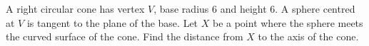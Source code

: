 A right circular cone has vertex $V$, base radius $6$ and height $6$. A sphere centred at $V$ is tangent to the plane of the base. Let $X$ be a point where the sphere meets the curved surface of the cone. Find the distance from $X$ to the axis of the cone.
